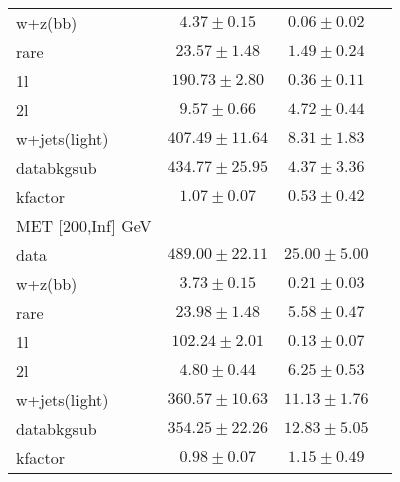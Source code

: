 \begin{table}
\begin{center}
\begin{tabular}{lccc}
\hline
w+z(bb)&$4.37\pm0.15$&$0.06\pm0.02$\\
rare&$23.57\pm1.48$&$1.49\pm0.24$\\
1l&$190.73\pm2.80$&$0.36\pm0.11$\\
2l&$9.57\pm0.66$&$4.72\pm0.44$\\
w+jets(light)&$407.49\pm11.64$&$8.31\pm1.83$\\
\hline
databkgsub&$434.77\pm25.95$&$4.37\pm3.36$\\
kfactor&$1.07\pm0.07$&$0.53\pm0.42$\\
\hline\hline
\hline
MET [200,Inf] GeV & &\\
\hline
data&$489.00\pm22.11$&$25.00\pm5.00$\\
\hline
w+z(bb)&$3.73\pm0.15$&$0.21\pm0.03$\\
rare&$23.98\pm1.48$&$5.58\pm0.47$\\
1l&$102.24\pm2.01$&$0.13\pm0.07$\\
2l&$4.80\pm0.44$&$6.25\pm0.53$\\
w+jets(light)&$360.57\pm10.63$&$11.13\pm1.76$\\
\hline
databkgsub&$354.25\pm22.26$&$12.83\pm5.05$\\
kfactor&$0.98\pm0.07$&$1.15\pm0.49$\\
\hline\hline
\hline
\end{tabular}
\end{center}
\end{table}
